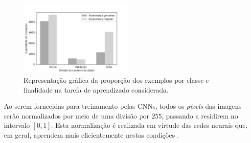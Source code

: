 \begin{figure}[h!]
\centering
\caption{Representação gráfica da proporção dos exemplos por classe e finalidade na tarefa de aprendizado considerada.}
\label{fig:divisao-dados}
\includegraphics[width=0.5\textwidth]{imgs/divisao-dados}
\end{figure}

Ao serem fornecidas para treinamento pelas CNNs, todos os \emph{pixels} das imagens serão normalizados por meio de uma divisão por $255$, passando a residirem no intervalo $[0,1]$. Esta normalização é realizada em virtude das redes neurais que, em geral, aprendem mais eficientemente nestas condições \cite{chollet}.
